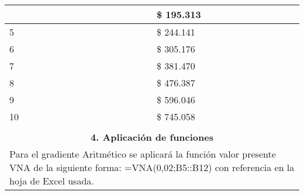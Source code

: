 \begin{center}
\begin{longtable}[H]{|p{0.5\linewidth}|p{0.5\linewidth}|}
{\begin{center}
\begin{tabular}{|l|l|}
              4  & \$ 195.313 \\ \hline
              5  & \$ 244.141 \\ \hline
              6  & \$ 305.176 \\ \hline
              7  & \$ 381.470 \\ \hline
              8  & \$ 476.387 \\ \hline
              9  & \$ 596.046 \\ \hline
              10 & \$ 745.058 \\ \hline
            \end{tabular}
        \end{center}   
     } \\
     
    \multicolumn{2}{|c|}{\cellcolor[HTML]{FFB183}\textbf{4. Aplicación de funciones}}                  \\ \hline
    \multicolumn{2}{|p{\columnwidth}|}{Para el gradiente Aritmético se aplicará la función valor presente VNA de la siguiente forma: \newline
    =VNA(0,02;B5::B12) con referencia en la hoja de Excel usada.}                                      \\

\end{longtable}
\end{center}
